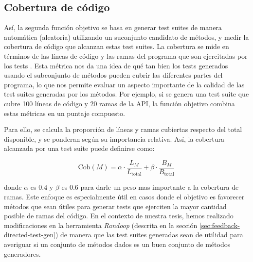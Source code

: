 \subsection{Cobertura de código}
\label{sec:fitnessRandoop}

 Así, la segunda función objetivo se basa en generar test suites
de manera automática (aleatoria) utilizando un suconjunto candidato de métodos,  
y medir la cobertura de código que alcanzan estas test suites. 
La cobertura se mide en términos de las líneas de código y las ramas del
programa que son ejercitadas por los tests .
Esta métrica nos da una idea de qué tan bien los tests generados usando el
subconjunto de métodos pueden cubrir las diferentes partes del programa, 
lo que nos permite evaluar un aspecto importante de la calidad de las test
suites generadas por los métodos.
Por ejemplo, si se genera una test suite que cubre 100 líneas de código y 20 ramas de la API, 
la función objetivo combina estas métricas en un puntaje compuesto.

Para ello, se calcula la proporción de líneas y ramas cubiertas respecto del total disponible, 
y se ponderan según su importancia relativa. Así, la cobertura alcanzada por una
test suite puede definirse como:

\[
\text{Cob}(M) = \alpha \cdot \frac{L_M}{L_{\text{total}}} + \beta \cdot \frac{B_M}{B_{\text{total}}}
\]

donde $\alpha$ es $0.4$ y $\beta$ es $0.6$ para darle un peso mas importante a la cobertura de ramas.
Este enfoque es especialmente útil en casos donde el objetivo es favorecer
métodos que sean útiles para generar tests que ejerciten la mayor cantidad
posible de ramas del código.
En el contexto de nuestra tesis, hemos realizado modificaciones en la
herramienta \emph{Randoop} (descrita en la sección
\ref{sec:feedback-directed-test-gen})
de manera que las test suites generadas sean de utilidad para averiguar si un conjunto de 
métodos dados es un buen conjunto de métodos generadores.

